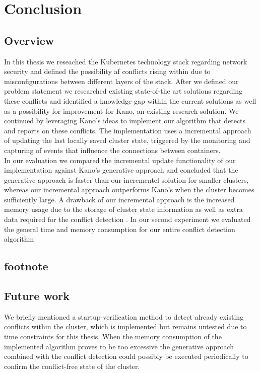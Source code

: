 \chapter{Conclusion}                                 \label{ch:conclusion}

\section{Overview} \label{sec:overview}
In this thesis we reseached the Kubernetes technology stack regarding network security and defined the possibility af conflicts rising within due to misconfigurations between different layers of the stack. After we defined our problem statement we researched existing state-of-the art solutions regarding these conflicts and identified a knowledge gap within the current solutions as well as a possibility for improvement for Kano, an existing research solution. We continued by leveraging Kano's ideas to implement our algorithm that detects and reports on these conflicts. The implementation uses a incremental approach of updating the last locally saved cluster state, triggered by the monitoring and capturing of events that influence the connections between containers. 
\\[10pt]

In our evaluation we compared the incremental update functionality of our implementation against Kano's generative approach and concluded that the generative approach is faster than our incrementel solution for smaller clusters, whereas our incremental approach outperforms Kano's when the cluster becomes sufficiently large. A drawback of our incremental approach is the increased memory usage due to the storage of cluster state information as well as extra data required for the conflict detection . In our second experiment we evaluated the general time and memory consumption for our entire conflict detection algorithm 
\\[10pt]

\section{footnote} \label{sec:footnote}

\section{Future work} \label{sec:futurework}
We briefly mentioned a startup-verification method to detect already existing conflicts within the cluster, which is implemented but remains untested due to time constraints for this thesis. When the memory consumption of the implemented algorithm proves to be too excessive the generative approach combined with the conflict detection could possibly be executed periodically to confirm the conflict-free state of the cluster.
\\[10pt]

